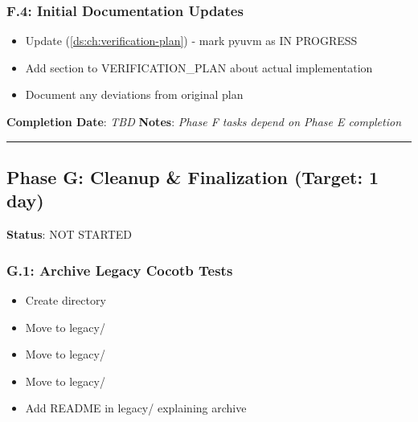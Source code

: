 \subsubsection{F.4: Initial Documentation Updates}\label{cr:status:pyuvm-migration:f4-initial-documentation-updates}

\begin{record}

\begin{itemize}
\tightlist
\item[$\square$]
  Update  (\cref{ds:ch:verification-plan}) - mark pyuvm as IN
  PROGRESS
\item[$\square$]
  Add section to VERIFICATION\_\allowbreak{}PLAN about actual
  implementation
\item[$\square$]
  Document any deviations from original plan
\end{itemize}

\textbf{Completion Date}: \emph{TBD} \textbf{Notes}: \emph{Phase F tasks
depend on Phase E completion}

\begin{center}\rule{0.5\linewidth}{0.5pt}\end{center}

\end{record}

\subsection{Phase G: Cleanup \& Finalization (Target: 1 day)}\label{cr:status:pyuvm-migration:phase-g-cleanup-finalization-target-1-day}

\begin{record}

\textbf{Status}: NOT STARTED

\end{record}

\subsubsection{G.1: Archive Legacy Cocotb Tests}\label{cr:status:pyuvm-migration:g1-archive-legacy-cocotb-tests}

\begin{record}

\begin{itemize}
\tightlist
\item[$\square$]
  Create  directory
\item[$\square$]
  Move  to legacy/
\item[$\square$]
  Move  to legacy/
\item[$\square$]
  Move  to legacy/
\item[$\square$]
  Add README in legacy/ explaining archive
\end{itemize}

\end{record}

